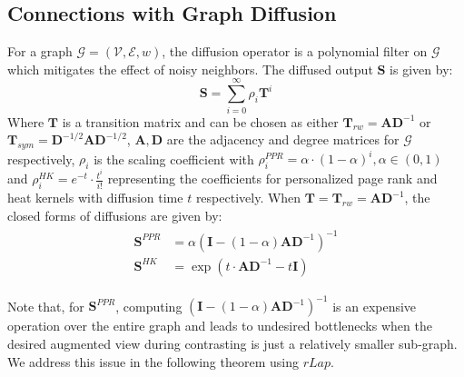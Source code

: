 \documentclass{article}
\def\mA{{\mathbf{A}}}
\def\mD{{\mathbf{D}}}
\def\mI{{\mathbf{I}}}
\def\mS{{\mathbf{S}}}
\def\mT{{\mathbf{T}}}
\def\gE{{\mathcal{E}}}
\def\gG{{\mathcal{G}}}
\def\gV{{\mathcal{V}}}
\theoremstyle{plain}
\theoremstyle{definition}
\theoremstyle{remark}
\begin{document}
\subsection{Connections with Graph Diffusion}

For a graph $\gG = (\gV, \gE, w)$, the diffusion operator is a polynomial filter on $\gG$ which mitigates the effect of noisy neighbors. The diffused output $\mS$ is given by:
\begin{equation}
\label{eq:diffusion}
    \mS = \sum_{i=0}^{\infty}\rho_i \mT^i
\end{equation}
Where $\mT$ is a transition matrix \citep{klicpera2019diffusion} and can be chosen as either $\mT_{rw} = \mA\mD^{-1}$ or $\mT_{sym} = \mD^{-1/2}\mA\mD^{-1/2}$, $\mA, \mD$ are the adjacency and degree matrices for $\gG$ respectively,  $\rho_i$ is the scaling coefficient with $\rho_i^{PPR} = \alpha \cdot (1 - \alpha)^i, \alpha \in (0,1)$ and $\rho_i^{HK} = e^{-t}\cdot \frac{t^i}{i!}$ representing the coefficients for personalized page rank \citep{page1999pagerank} and heat kernels with diffusion time $t$ \citep{kondor2002diffusion, chung2007heat} respectively. When $\mT = \mT_{rw} = \mA\mD^{-1}$, the closed forms of diffusions are given by:
\begin{align}
\label{eq:diffusion_rw}
\begin{split}
\mS^{PPR} &= \alpha(\mI - (1-\alpha)\mA\mD^{-1})^{-1} \\
\mS^{HK} & = \exp(t\cdot \mA\mD^{-1} - t\mI)  
\end{split}
\end{align}


Note that, for $\mS^{PPR}$, computing $(\mI - (1-\alpha)\mA\mD^{-1})^{-1}$ is an expensive operation over the entire graph and leads to undesired bottlenecks when the desired augmented view during contrasting is just a relatively smaller sub-graph. We address this issue in the following theorem using $rLap$.
\end{document}
